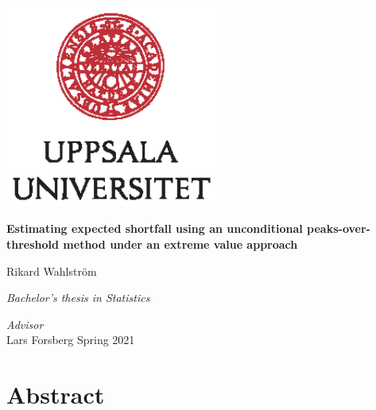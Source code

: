 \documentclass[a4paper,11pt]{article}
\renewcommand{\baselinestretch}{1.5}
\theoremstyle{definition}
\theoremstyle{definition}
\theoremstyle{definition}
\theoremstyle{definition}
\theoremstyle{remark}
\begin{document}

\thispagestyle{empty}
\begin{center}
\includegraphics[width=7cm]{UU_logo_CMYK.eps}
\end{center}
\vspace{1.5cm}
\begin{center}
\begin{Large}
{\bf Estimating expected shortfall using an unconditional peaks-over-threshold method under an extreme value approach} 
\end{Large}
\end{center}
\vskip1.5cm
\renewcommand{\baselinestretch}{1}
\begin{center}
{\large Rikard Wahlström} 
\vskip2.5cm
\begin{center}
\begin{large}
{\it Bachelor's thesis in Statistics}\\
\end{large}
\end{center}
\vskip2cm
{\large\it Advisor}\\
{\large Lars Forsberg} 
\vskip2cm
{\large Spring 2021} 
\end{center}\vfill

\pagestyle{plain}
\setcounter{page}{1}    %

\newpage
\hypertarget{abstract}{%
\section*{Abstract}\label{abstract}}
\end{document}
